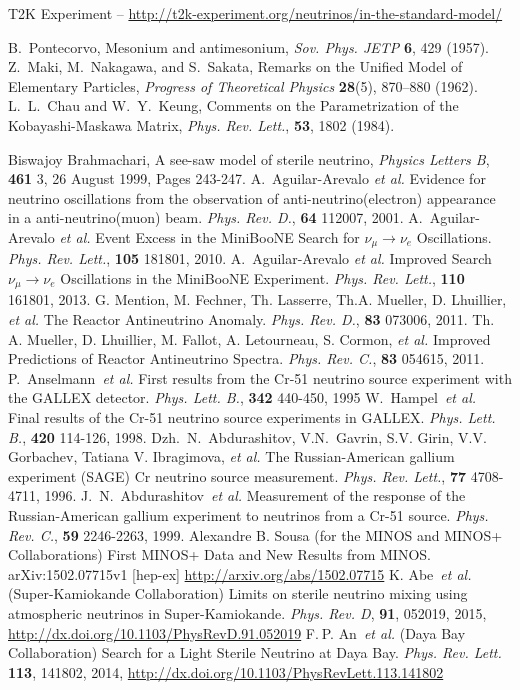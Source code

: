 \documentclass[aps,prd,twocolumn,nofootinbib]{revtex4-1}
\begin{document}
\begin{thebibliography}{9}
  T2K Experiment -- \url{http://t2k-experiment.org/neutrinos/in-the-standard-model/}

  B.~Pontecorvo,
  Mesonium and antimesonium,
  \emph{Sov. Phys. JETP} {\bf 6}, 429 (1957).
  Z.~Maki, M.~Nakagawa, and S.~Sakata,
  Remarks on the Unified Model of Elementary Particles,
  \emph{Progress of Theoretical Physics} {\bf 28}(5), 870–880 (1962).
  L.~L.~Chau and W.~Y.~Keung,
  Comments on the Parametrization of the Kobayashi-Maskawa Matrix,
  \emph{Phys. Rev. Lett.}, {\bf 53}, 1802 (1984).

Biswajoy Brahmachari, A see-saw model of sterile neutrino, \emph{Physics Letters B}, {\bf 461} 3, 26 August 1999, Pages 243-247.
  A.~Aguilar-Arevalo \emph{et al.} Evidence for neutrino oscillations from the observation of anti-neutrino(electron) appearance in a anti-neutrino(muon) beam. \emph{Phys. Rev. D.}, {\bf 64} 112007, 2001.
  A.~Aguilar-Arevalo \emph{et al.} Event Excess in the MiniBooNE Search for $\nu_\mu \rightarrow \nu_e$ Oscillations. \emph{Phys. Rev. Lett.}, {\bf 105} 181801, 2010.
  A.~Aguilar-Arevalo \emph{et al.} Improved Search $\nu_\mu \rightarrow \nu_e$ Oscillations in the MiniBooNE Experiment. \emph{Phys. Rev. Lett.}, {\bf 110} 161801, 2013.
  G. Mention, M. Fechner, Th. Lasserre, Th.A. Mueller, D. Lhuillier, \emph{et al.} The Reactor Antineutrino Anomaly. \emph{Phys. Rev. D.}, {\bf 83} 073006, 2011.
  Th. A. Mueller, D. Lhuillier, M. Fallot, A. Letourneau, S. Cormon, \emph{et al.} Improved Predictions of Reactor Antineutrino Spectra. \emph{Phys. Rev. C.}, {\bf 83} 054615, 2011.
  P.~Anselmann~\emph{et al.} First results from the Cr-51 neutrino source experiment with the GALLEX detector. \emph{Phys. Lett. B.}, {\bf 342} 440-450, 1995
  W.~Hampel~\emph{et al.} Final results of the Cr-51 neutrino source experiments in GALLEX. \emph{Phys. Lett. B.}, {\bf 420} 114-126, 1998.
  Dzh.~N.~Abdurashitov, V.N.~Gavrin, S.V. Girin, V.V. Gorbachev, Tatiana V. Ibragimova, \emph{et al.} The Russian-American gallium experiment (SAGE) Cr neutrino source measurement. \emph{Phys. Rev. Lett.}, {\bf 77} 4708-4711, 1996.
  J.~N.~Abdurashitov~\emph{et al.} Measurement of the response of the Russian-American gallium experiment to neutrinos from a Cr-51 source. \emph{Phys. Rev. C.}, {\bf 59} 2246-2263, 1999.
  Alexandre B. Sousa (for the MINOS and MINOS+ Collaborations) First MINOS+ Data and New Results from MINOS. arXiv:1502.07715v1 [hep-ex] \url{http://arxiv.org/abs/1502.07715}
  K. Abe~\emph{et al.} (Super-Kamiokande Collaboration) Limits on sterile neutrino mixing using atmospheric neutrinos in Super-Kamiokande. \emph{Phys. Rev. D}, {\bf 91}, 052019, 2015, \url{http://dx.doi.org/10.1103/PhysRevD.91.052019}
  F. P. An~\emph{et al.} (Daya Bay Collaboration) Search for a Light Sterile Neutrino at Daya Bay. \emph{Phys. Rev. Lett.} {\bf 113}, 141802, 2014, \url{http://dx.doi.org/10.1103/PhysRevLett.113.141802}

\end{thebibliography}
\end{document}
